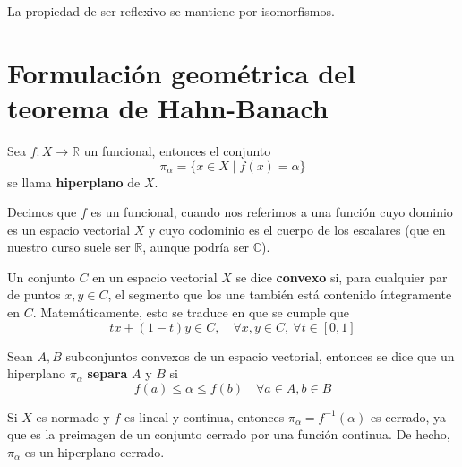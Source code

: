 \begin{prop}
    La propiedad de ser reflexivo se mantiene por isomorfismos.
\end{prop}

\section{Formulación geométrica del teorema de Hahn-Banach}

\begin{definicion}
    Sea $f: X \to \mathbb{R}$ un funcional, entonces el conjunto 
    \begin{equation*}
        \pi_\alpha = \{ x \in X \mid f(x) = \alpha \}
    \end{equation*}
    se llama \textbf{hiperplano} de $X$.
\end{definicion}

\begin{observacion}
    Decimos que $f$ es un funcional, cuando nos referimos a una función cuyo dominio es un espacio vectorial $X$ y cuyo codominio es el cuerpo de los escalares (que en nuestro curso suele ser $\mathbb{R}$, aunque podría ser $\mathbb{C}$). 
\end{observacion}

\begin{definicion}
    Un conjunto $C$ en un espacio vectorial $X$ se dice \textbf{convexo} si, para cualquier par de puntos $x, y \in C$, el segmento que los une también está contenido íntegramente en $C$.  Matemáticamente, esto se traduce en que se cumple que
    \begin{equation*}
        tx + (1-t)y \in C, \quad \forall x, y \in C, \ \forall t \in [0, 1]
    \end{equation*}
    
\end{definicion}

\begin{definicion}
    Sean $A,B$ subconjuntos convexos de un espacio vectorial, entonces se dice que un hiperplano $\pi_\alpha$ \textbf{separa} $A$ y $B$ si
    \begin{equation*}
        f(a) \leq \alpha \leq f(b) \quad \forall a \in A, b \in B
    \end{equation*}
\end{definicion}

\begin{observacion}
    Si $X$ es normado y $f$ es lineal y continua, entonces $\pi_\alpha = f^{-1}(\alpha)$ es cerrado, ya que es la preimagen de un conjunto cerrado por una función continua. De hecho, $\pi_\alpha$ es un hiperplano cerrado. \\
\end{observacion}


